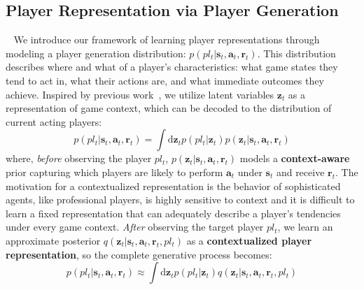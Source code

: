\documentclass[letterpaper]{article} %
\newcommand{\latentvariables}{\mathbf{z}}
\newcommand{\state}{\mathbf{s}}
\newcommand{\action}{\mathbf{a}}
\newcommand{\reward}{\boldsymbol{r}}
\newcommand{\player}{pl}
\begin{document}
%
\subsection{Player Representation via Player Generation}~\label{subsec:player-represent-framework}
We introduce our framework of learning player representations through modeling a player generation distribution: $p(\player_{t}|\state_{t},\action_{t},\reward_{t})$. This distribution describes where and what of a player's characteristics: what game states they tend to act in, what their actions are, and what immediate outcomes they achieve.
Inspired by previous work~\cite{HausmanEmbedSkills18,zintgraf2019variational,WhitneyACG20}, we utilize latent variables $\latentvariables_{t}$ as a representation of game context, which can be decoded to the distribution of current acting players:
\begin{equation}
    p(\player_{t}|\state_{t},\action_{t},\reward_{t}) =  \int\mathrm{d}\latentvariables_{t}p(\player_{t}|\latentvariables_{t})p(\latentvariables_{t}|\state_{t},\action_{t},\reward_{t})
\end{equation}
where, {\it before} observing the player $\player_{t}$, \space $p(\latentvariables_{t}|\state_{t},\action_{t},\reward_{t})$ models a {\bf context-aware} prior capturing which players are likely to perform $\action_{t}$ under $\state_{t}$ and receive $\reward_{t}$. 
The motivation for a contextualized representation is the behavior of sophisticated agents, like professional players, is highly sensitive to context and it is difficult to learn a fixed representation that can adequately describe a player's tendencies under every game context.
{\it After} observing the target player $\player_{t}$, we 
learn an approximate posterior $q(\latentvariables_{t}|\state_{t},\action_{t},\reward_{t},\player_{t})$ as a {\bf contextualized player representation}, so the complete generative process becomes:
\begin{equation}
    p(\player_{t}|\state_{t},\action_{t},\reward_{t}) \approx \int\mathrm{d}\latentvariables_{t}p(\player_{t}|\latentvariables_{t})q(\latentvariables_{t}|\state_{t},\action_{t},\reward_{t},\player_{t}) \label{eq:generation}
\end{equation}
\end{document}
